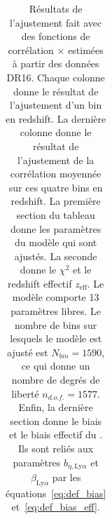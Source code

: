 \begin{table}[]
  \centering
  \caption{Résultats de l'ajustement fait avec \picca{} des fonctions de corrélation \lya{}$\times$\lya{} estimées à partir des données DR16. Chaque colonne donne le résultat de l'ajustement d'un bin en redshift. La dernière colonne donne le résultat de l'ajustement de la corrélation moyennée sur ces quatre bins en redshift. La première section du tableau donne les paramètres du modèle qui sont ajustés. La seconde donne le $\chi^2$ et le redshift effectif $z_{\mathrm{eff}}$. Le modèle comporte \num{13} paramètres libres. Le nombre de bins sur lesquels le modèle est ajusté est $N_{bin} = \num{1590}$, ce qui donne un nombre de degrés de liberté $n_{d.o.f.} = \num{1577}$. Enfin, la dernière section donne le biais et le biais effectif du \lya{}. Ils sont reliés aux paramètres $b_{\eta, \mathrm{Ly}\alpha}$ et $\beta_{\mathrm{Ly}\alpha}$ par les équations~\ref{eq:def_bias} et~\ref{eq:def_bias_eff}.}
  \label{tab:dr16_4bins}
  \footnotesize
  \begin{tabular}{lccccc}

\end{tabular}
\end{table}
